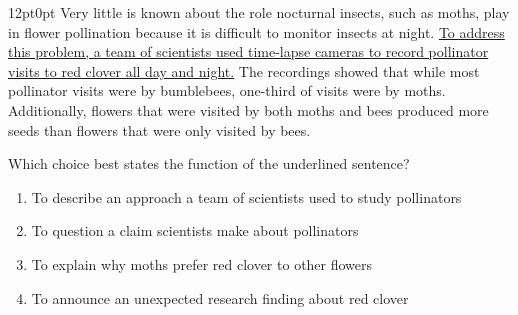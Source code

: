 \documentclass[11pt, twocolumn]{article}
\newcounter{questionnum}
\begin{document}
\vspace{6pt}\noindent
\begin{minipage}{\columnwidth}\raggedright
\noindent{}\par\vspace{8pt}
\begin{adjustwidth}{12pt}{0pt}
Very little is known about the role nocturnal insects, such as moths, play in flower pollination because it is difficult to monitor insects at night. \uline{To address this problem, a team of scientists used time-lapse cameras to record pollinator visits to red clover all day and night.} The recordings showed that while most pollinator visits were by bumblebees, one-third of visits were by moths. Additionally, flowers that were visited by both moths and bees produced more seeds than flowers that were only visited by bees.
\vspace{6pt}

Which choice best states the function of the underlined sentence?
\begin{enumerate}[label=\Alph*),leftmargin=18pt,topsep=3pt,itemsep=2pt]
  \item To describe an approach a team of scientists used to study pollinators
  \item To question a claim scientists make about pollinators
  \item To explain why moths prefer red clover to other flowers
  \item To announce an unexpected research finding about red clover
\end{enumerate}
\end{adjustwidth}
\end{minipage}\par
\end{document}

